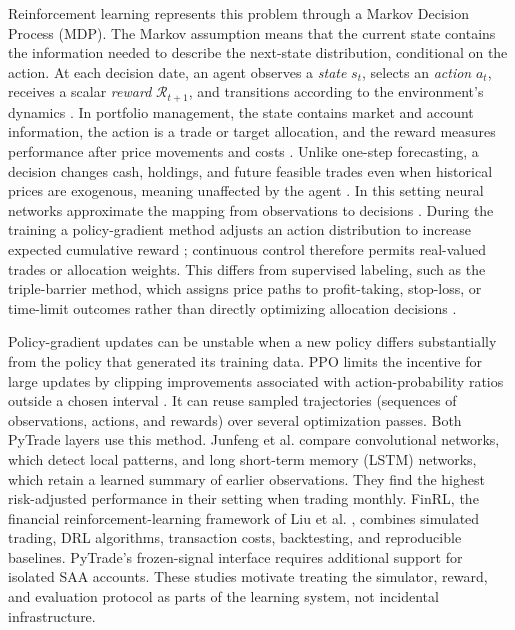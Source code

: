 Reinforcement learning represents this problem through a Markov Decision Process (MDP). The Markov assumption means that the current state contains the information needed to describe the next-state distribution, conditional on the action. At each decision date, an agent observes a \emph{state} $s_t$, selects an \emph{action} $a_t$, receives a scalar \emph{reward} $\mathcal R_{t+1}$, and transitions according to the environment's dynamics \cite{SuttonBarto}. In portfolio management, the state contains market and account information, the action is a trade or target allocation, and the reward measures performance after price movements and costs \cite{LopezdePrado.2018}. Unlike one-step forecasting, a decision changes cash, holdings, and future feasible trades even when historical prices are exogenous, meaning unaffected by the agent \cite{Sutiene2024}. In this setting neural networks approximate the mapping from observations to decisions \cite{Goodfellow-et-al-2016}. During the training a policy-gradient method adjusts an action distribution to increase expected cumulative reward \cite{SuttonBarto}; continuous control therefore permits real-valued trades or allocation weights. This differs from supervised labeling, such as the triple-barrier method, which assigns price paths to profit-taking, stop-loss, or time-limit outcomes rather than directly optimizing allocation decisions \cite{LopezdePrado.2018}.

Policy-gradient updates can be unstable when a new policy differs substantially from the policy that generated its training data. PPO limits the incentive for large updates by clipping improvements associated with action-probability ratios outside a chosen interval \cite{JohnSchulmanFilipWolskiPrafullaDhariwalAlecRadfordOlegKlimov.2017}. It can reuse sampled trajectories (sequences of observations, actions, and rewards) over several optimization passes. Both PyTrade layers use this method. Junfeng et al. \cite{Junfeng.2024} compare convolutional networks, which detect local patterns, and long short-term memory (LSTM) networks, which retain a learned summary of earlier observations. They find the highest risk-adjusted performance in their setting when trading monthly. FinRL, the financial reinforcement-learning framework of Liu et al. \cite{liu2022finrldeepreinforcementlearning}, combines simulated trading, DRL algorithms, transaction costs, backtesting, and reproducible baselines. PyTrade's frozen-signal interface requires additional support for isolated SAA accounts. These studies motivate treating the simulator, reward, and evaluation protocol as parts of the learning system, not incidental infrastructure.


